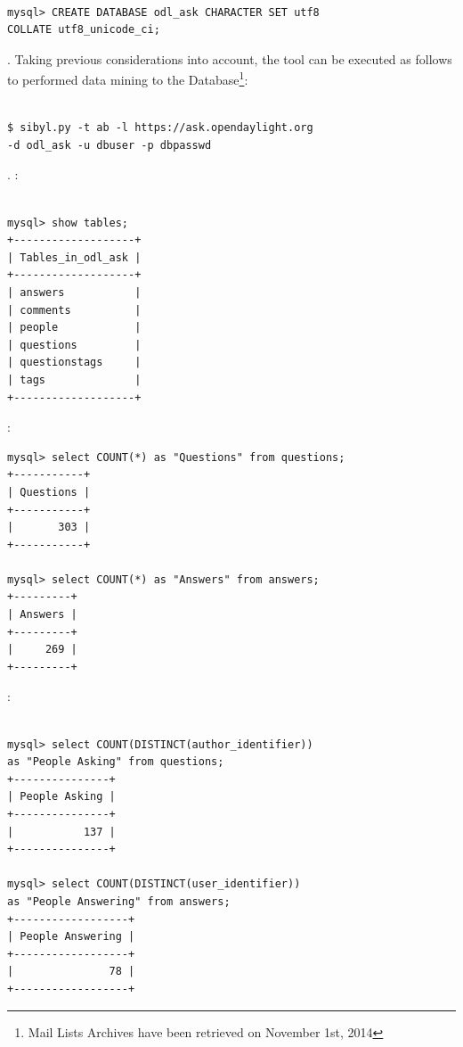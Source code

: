 \documentclass[a4paper, 12pt]{book}
\begin{document}
\begin{verbatim}

mysql> CREATE DATABASE odl_ask CHARACTER SET utf8
COLLATE utf8_unicode_ci;

\end{verbatim}
. Taking previous considerations into account, the tool can be executed as follows to performed data mining to the Database\footnote{Mail Lists Archives have been retrieved on November 1st, 2014}:

\begin{verbatim}

$ sibyl.py -t ab -l https://ask.opendaylight.org
-d odl_ask -u dbuser -p dbpasswd

\end{verbatim}

.
:

\begin{verbatim}

mysql> show tables;
+-------------------+
| Tables_in_odl_ask |
+-------------------+
| answers           |
| comments          |
| people            |
| questions         |
| questionstags     |
| tags              |
+-------------------+

\end{verbatim}
:

\begin{verbatim}
mysql> select COUNT(*) as "Questions" from questions;
+-----------+
| Questions |
+-----------+
|       303 |
+-----------+

mysql> select COUNT(*) as "Answers" from answers;
+---------+
| Answers |
+---------+
|     269 |
+---------+

\end{verbatim}

:
\begin{verbatim}

mysql> select COUNT(DISTINCT(author_identifier))
as "People Asking" from questions;
+---------------+
| People Asking |
+---------------+
|           137 |
+---------------+

mysql> select COUNT(DISTINCT(user_identifier))
as "People Answering" from answers;
+------------------+
| People Answering |
+------------------+
|               78 |
+------------------+

\end{verbatim}
\end{document}

